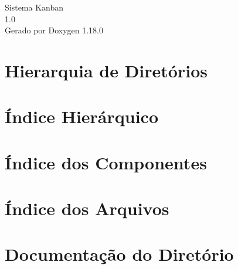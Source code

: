\documentclass[twoside]{book}
\newcommand{\+}{\discretionary{\mbox{\scriptsize$\hookleftarrow$}}{}{}}
\newcommand{\clearemptydoublepage}{%
    \newpage{\pagestyle{empty}\cleardoublepage}%
  }
\begin{document}
  \raggedbottom
    \hypersetup{pageanchor=false,
                bookmarksnumbered=true,
                pdfencoding=unicode
               }
  \begin{titlepage}
  \vspace*{7cm}
  \begin{center}%
  {\Large Sistema Kanban}\\
  [1ex]\large 1.\+0 \\
  \vspace*{1cm}
  {\large Gerado por Doxygen 1.18.0}\\
  \end{center}
  \end{titlepage}
  \clearemptydoublepage
  \tableofcontents
  \clearemptydoublepage
  \hypersetup{pageanchor=true}
\chapter{Hierarquia de Diretórios}

\chapter{Índice Hierárquico}

\chapter{Índice dos Componentes}

\chapter{Índice dos Arquivos}

\chapter{Documentação do Diretório}







\end{document}

